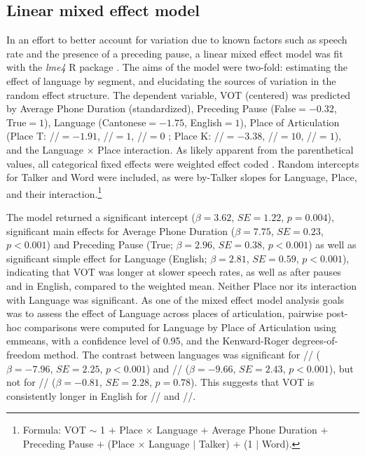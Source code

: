 \subsection{Linear mixed effect model}
In an effort to better account for variation due to known factors such as speech rate and the presence of a preceding pause, a linear mixed effect model was fit with the \textit{lme4} R package \citep{bates_2015_lme4}. The aims of the model were two-fold: estimating the effect of language by segment, and elucidating the sources of variation in the random effect structure. The dependent variable, VOT (centered) was predicted by Average Phone Duration (standardized), Preceding Pause (False$=-0.32$, True$=1$), Language (Cantonese$=-1.75$, English$=1$), Place of Articulation (Place T: //$=-1.91$, //$=1$, //$=0$ ; Place K: //$=-3.38$, //$=10$, //$=1$), and the Language $\times$ Place interaction. As likely apparent from the parenthetical values, all categorical fixed effects were weighted effect coded \citep[following][]{chodroff_2017_structure}. Random intercepts for Talker and Word were included, as were by-Talker slopes for Language, Place, and their interaction.\footnote{Formula: VOT $\sim$ 1 $+$ Place $\times$ Language $+$ Average Phone Duration $+$ Preceding Pause $+$ (Place $\times$ Language $|$ Talker) $+$ (1 $|$ Word).}

The model returned a significant intercept ($\beta=3.62$, $SE=1.22$, $p=0.004$), significant main effects for Average Phone Duration ($\beta=7.75$, $SE=0.23$, $p<0.001$) and Preceding Pause (True; $\beta=2.96$, $SE=0.38$, $p<0.001$) as well as significant simple effect for Language (English; $\beta=2.81$, $SE=0.59$, $p<0.001$), indicating that VOT was longer at slower speech rates, as well as after pauses and in English, compared to the weighted mean. Neither Place nor its interaction with Language was significant. As one of the mixed effect model analysis goals was to assess the effect of Language across places of articulation, pairwise post-hoc comparisons were computed for Language by Place of Articulation using emmeans, with a confidence level of 0.95, and the Kenward-Roger degrees-of-freedom method. The contrast between languages was significant for // ($\beta=-7.96$, $SE=2.25$, $p<0.001$) and // ($\beta=-9.66$, $SE=2.43$, $p<0.001$), but not for // ($\beta=-0.81$, $SE=2.28$, $p=0.78$). This suggests that VOT is consistently longer in English for // and //.

